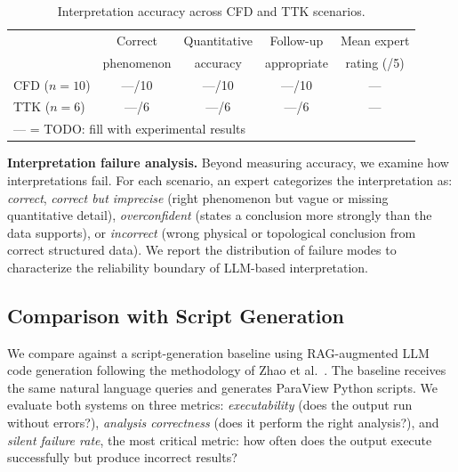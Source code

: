 \documentclass{vgtc}                          %
\begin{document}
\begin{table}[tb]
  \caption{Interpretation accuracy across CFD and TTK scenarios.}
  \label{tab:interp_accuracy}
  \centering
  \scriptsize
  \begin{tabular}{lcccc}
  \toprule
  & Correct & Quantitative & Follow-up & Mean expert \\
  & phenomenon & accuracy & appropriate & rating (/5) \\
  \midrule
  CFD ($n=10$) & ---/10 & ---/10 & ---/10 & --- \\
  TTK ($n=6$)  & ---/6  & ---/6  & ---/6  & --- \\
  \bottomrule
  \multicolumn{5}{l}{\scriptsize --- = TODO: fill with experimental results} \\
  \end{tabular}
\end{table}

\textbf{Interpretation failure analysis.}
Beyond measuring accuracy, we examine how interpretations fail.
For each scenario, an expert categorizes the interpretation as:
\textit{correct}, \textit{correct but imprecise} (right phenomenon but vague
or missing quantitative detail), \textit{overconfident} (states a conclusion
more strongly than the data supports), or \textit{incorrect} (wrong physical
or topological conclusion from correct structured data).
We report the distribution of failure modes to characterize the reliability
boundary of LLM-based interpretation.


\subsection{Comparison with Script Generation}

We compare against a script-generation baseline using RAG-augmented LLM code
generation following the methodology of Zhao et
al.~\cite{Zhao:2026:RAG}.
The baseline receives the same natural language queries and generates ParaView
Python scripts.
We evaluate both systems on three metrics:
\textit{executability} (does the output run without errors?),
\textit{analysis correctness} (does it perform the right analysis?),
and \textit{silent failure rate}, the most critical metric: how often does the
output execute successfully but produce incorrect results?
\end{document}
